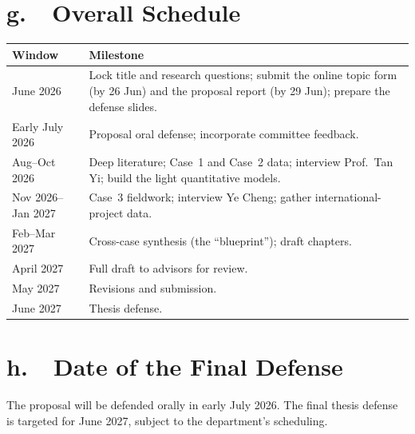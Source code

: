 \documentclass[11pt]{article}
\begin{document}
\section*{g.~~Overall Schedule}
\begin{center}
\begin{tabular}{|p{3.3cm}|p{11.0cm}|}
\hline
\textbf{Window} & \textbf{Milestone} \\ \hline
June 2026 & Lock title and research questions; submit the online topic form (by 26 Jun) and the proposal report (by 29 Jun); prepare the defense slides. \\ \hline
Early July 2026 & Proposal oral defense; incorporate committee feedback. \\ \hline
Aug--Oct 2026 & Deep literature; Case~1 and Case~2 data; interview Prof.\ Tan Yi; build the light quantitative models. \\ \hline
Nov 2026--Jan 2027 & Case~3 fieldwork; interview Ye Cheng; gather international-project data. \\ \hline
Feb--Mar 2027 & Cross-case synthesis (the ``blueprint''); draft chapters. \\ \hline
April 2027 & Full draft to advisors for review. \\ \hline
May 2027 & Revisions and submission. \\ \hline
June 2027 & Thesis defense. \\ \hline
\end{tabular}
\end{center}

\section*{h.~~Date of the Final Defense}
The proposal will be defended orally in early July 2026. The final thesis defense is targeted for June 2027, subject to the department's scheduling.
\end{document}
